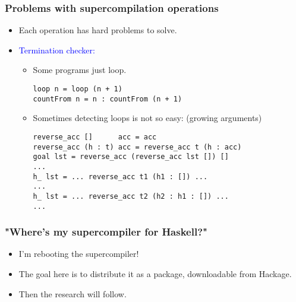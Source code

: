 \documentclass{beamer}
\begin{document}
\begin{frame}[fragile]
    \frametitle{Problems with supercompilation operations}

    \begin{itemize}[<+->]

        \item[]
            Each operation has hard problems to solve.

        \item[]
            \textcolor{blue}{Termination checker:}

            \begin{itemize}

                \item[]
                    Some programs just loop.

                    \begin{verbatim}
loop n = loop (n + 1)
countFrom n = n : countFrom (n + 1)
                    \end{verbatim}

                \item[]
                    Sometimes detecting loops is not so easy: (growing
                    arguments)

                    \begin{verbatim}
reverse_acc []      acc = acc
reverse_acc (h : t) acc = reverse_acc t (h : acc)
goal lst = reverse_acc (reverse_acc lst []) []
...
h_ lst = ... reverse_acc t1 (h1 : []) ...
...
h_ lst = ... reverse_acc t2 (h2 : h1 : []) ...
...
                    \end{verbatim}

            \end{itemize}

    \end{itemize}
\end{frame}

\begin{frame}
    \frametitle{"Where's my supercompiler for Haskell?"}

    \begin{itemize}[<+->]
        \item
            I'm rebooting the supercompiler!

        \item
            The goal here is to distribute it as a package, downloadable from
            Hackage.

        \item
            Then the research will follow.
    \end{itemize}
\end{frame}
\end{document}
